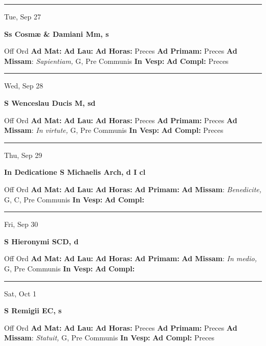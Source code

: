 \documentclass[letterpaper, 10pt]{article}
\begin{document}
\hrule
\begin{center}
Tue, Sep 27
\end{center}\textbf{ \large Ss Cosmæ \& Damiani Mm, \textnormal{\normalsize s}}
\begin{justify}
Off Ord
\textbf{Ad Mat: }
\textbf{Ad Lau: }
\textbf{Ad Horas: }Preces
\textbf{Ad Primam: }Preces
\textbf{Ad Missam}: \textit{Sapientiam,} G, Pre Communis
\textbf{In Vesp: }
\textbf{Ad Compl: }Preces\end{justify}



\hrule
\begin{center}
Wed, Sep 28
\end{center}\textbf{ \large S Wenceslau Ducis M, \textnormal{\normalsize sd}}
\begin{justify}
Off Ord
\textbf{Ad Mat: }
\textbf{Ad Lau: }
\textbf{Ad Horas: }Preces
\textbf{Ad Primam: }Preces
\textbf{Ad Missam}: \textit{In virtute,} G, Pre Communis
\textbf{In Vesp: }
\textbf{Ad Compl: }Preces\end{justify}



\hrule
\begin{center}
Thu, Sep 29
\end{center}\textbf{ \large In Dedicatione S Michaelis Arch, \textnormal{\normalsize d I cl}}
\begin{justify}
Off Ord
\textbf{Ad Mat: }
\textbf{Ad Lau: }
\textbf{Ad Horas: }
\textbf{Ad Primam: }
\textbf{Ad Missam}: \textit{Benedicite,} G, C, Pre Communis
\textbf{In Vesp: }
\textbf{Ad Compl: }\end{justify}



\hrule
\begin{center}
Fri, Sep 30
\end{center}\textbf{ \large S Hieronymi SCD, \textnormal{\normalsize d}}
\begin{justify}
Off Ord
\textbf{Ad Mat: }
\textbf{Ad Lau: }
\textbf{Ad Horas: }
\textbf{Ad Primam: }
\textbf{Ad Missam}: \textit{In medio,} G, Pre Communis
\textbf{In Vesp: }
\textbf{Ad Compl: }\end{justify}



\hrule
\begin{center}
Sat, Oct 1
\end{center}\textbf{ \large S Remigii EC, \textnormal{\normalsize s}}
\begin{justify}
Off Ord
\textbf{Ad Mat: }
\textbf{Ad Lau: }
\textbf{Ad Horas: }Preces
\textbf{Ad Primam: }Preces
\textbf{Ad Missam}: \textit{Statuit,} G, Pre Communis
\textbf{In Vesp: }
\textbf{Ad Compl: }Preces\end{justify}
\end{document}
